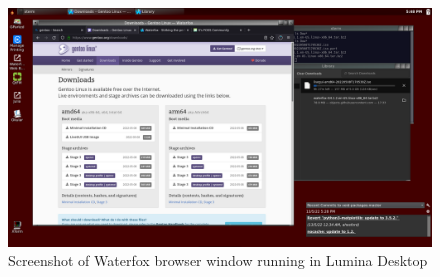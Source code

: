%

\begin{figure}[!h]
  \centering
   \includegraphics[totalheight=3.2in,width=1.0\textwidth]{watlum.png}
  \caption{Screenshot of Waterfox browser window running in Lumina Desktop}
  \label{fig:waterfox}
\end{figure}

%

